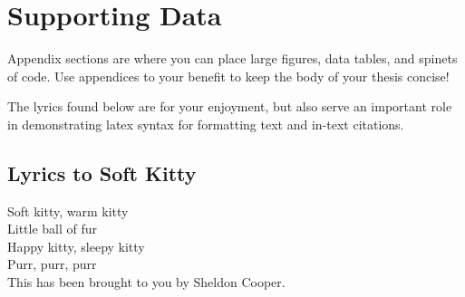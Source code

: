 \chapter{Supporting Data}

Appendix sections are where you can place large figures, data tables, and spinets of code. Use appendices to your benefit to keep the body of your thesis concise!

The lyrics found below are for your enjoyment, but also serve an important role in demonstrating latex syntax for formatting text and in-text citations.  

\section{Lyrics to Soft Kitty}

\begin{center}
\mbox{}
Soft kitty, warm kitty\\
Little ball of fur\\
Happy kitty, sleepy kitty\\
Purr, purr, purr\\[0.5in]

This has been brought to you by Sheldon Cooper.
\end{center}

\clearpage
